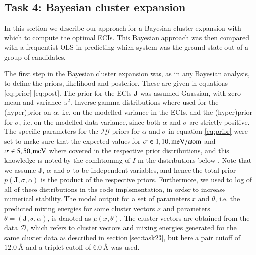\documentclass[11pt,a4paper]{article}
\begin{document}
\subsection[Task 4]{Task 4: Bayesian cluster expansion}

In this section we describe our approach for a Bayesian cluster expansion with which to compute the optimal ECIs. This Bayesian approach was then compared with a frequentist OLS in predicting which system was the ground state out of a group of candidates. 

The first step in the Bayesian cluster expansion was, as in any Bayesian analysis, to define the priors, likelihood and posterior. These are given in equations \eqref{eq:prior}-\eqref{eq:post}. The prior for the ECIs $\mathbf{J}$ was assumed Gaussian, with zero mean and variance $\alpha^2$. Inverse gamma distributions where used for the (hyper)prior on $\alpha$, i.e. on the modelled variance in the ECIs, and the (hyper)prior for $\sigma$, i.e. on the modelled data variance, since both $\alpha$ and $\sigma$ are strictly positive. The specific parameters for the $\mathcal{IG}$-priors for $\alpha$ and $\sigma$ in equation \eqref{eq:prior} were set to make sure that the expected values for $\sigma\in{1,10}, \rm meV/atom$ and $\sigma\in{5,50}, \rm meV$ where covered in the respective prior distributions, and this knowledge is noted by the conditioning of $I$ in the distributions below \cite{project_pm}. Note that we assume $\mathbf{J}$, $\alpha$ and $\sigma$ to be independent variables, and hence the total prior $p(\mathbf{J}, \sigma, \alpha)$ is the product of the respective priors. Furthermore, we used to log of all of these distributions in the code implementation, in order to increase numerical stability.  The model output for a set of parameters $x$ and $\theta$, i.e. the predicted mixing energies for some cluster vectors $x$ and parameters $\theta=(\mathbf{J}, \sigma, \alpha)$, is denoted as $\mu(x, \theta)$. The cluster vectors are obtained from the data $\mathcal{D}$, which refers to cluster vectors and mixing energies generated for the same cluster data as described in section \ref{sec:task23}, but here a pair cutoff of $\SI{12.0}{Å}$ and a triplet cutoff of $\SI{6.0}{Å}$ was used.
\end{document}

